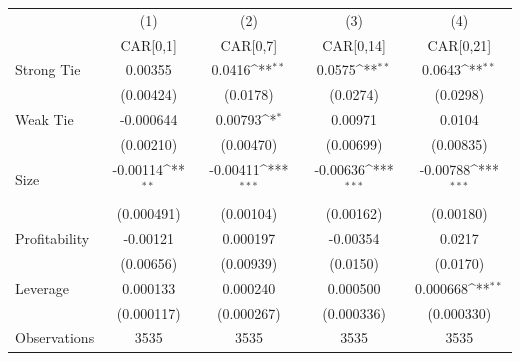 {
\def\sym#1{\ifmmode^{#1}\else\(^{#1}\)\fi}
\begin{tabular}{l*{4}{c}}
\hline\hline
                    &\multicolumn{1}{c}{(1)}&\multicolumn{1}{c}{(2)}&\multicolumn{1}{c}{(3)}&\multicolumn{1}{c}{(4)}\\
                    &\multicolumn{1}{c}{CAR[0,1]}&\multicolumn{1}{c}{CAR[0,7]}&\multicolumn{1}{c}{CAR[0,14]}&\multicolumn{1}{c}{CAR[0,21]}\\
\hline
Strong Tie          &     0.00355         &      0.0416\sym{**} &      0.0575\sym{**} &      0.0643\sym{**} \\
                    &   (0.00424)         &    (0.0178)         &    (0.0274)         &    (0.0298)         \\
[1em]
Weak Tie            &   -0.000644         &     0.00793\sym{*}  &     0.00971         &      0.0104         \\
                    &   (0.00210)         &   (0.00470)         &   (0.00699)         &   (0.00835)         \\
[1em]
Size                &    -0.00114\sym{**} &    -0.00411\sym{***}&    -0.00636\sym{***}&    -0.00788\sym{***}\\
                    &  (0.000491)         &   (0.00104)         &   (0.00162)         &   (0.00180)         \\
[1em]
Profitability       &    -0.00121         &    0.000197         &    -0.00354         &      0.0217         \\
                    &   (0.00656)         &   (0.00939)         &    (0.0150)         &    (0.0170)         \\
[1em]
Leverage            &    0.000133         &    0.000240         &    0.000500         &    0.000668\sym{**} \\
                    &  (0.000117)         &  (0.000267)         &  (0.000336)         &  (0.000330)         \\
\hline
Observations        &        3535         &        3535         &        3535         &        3535         \\
\hline\hline
\end{tabular}
}

